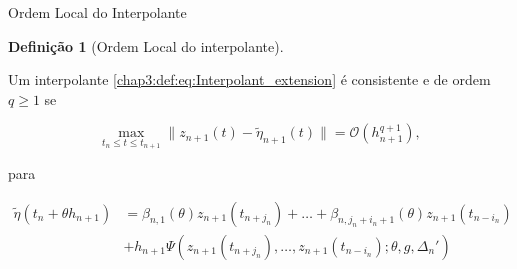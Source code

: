 \documentclass{beamer}
\theoremstyle{plain}
\theoremstyle{definition}
\newtheorem{defi}{Definição}
\begin{document}
\begin{frame}{Ordem Local do Interpolante}


    \small
    \begin{defi}[Ordem Local do interpolante]
        \label{chap3:def:interpolant_extension_order}

        Um interpolante \eqref{chap3:def:eq:Interpolant_extension} é consistente e de ordem $q \geq 1$ se


        \begin{equation}
            \max_{t_n \leq t \leq t_{n+1}}\| z_{n+1}(t) - \tilde{ \eta }_{n+1}(t) \| = \mathcal{O} (h_{n+1}^{q+1}), 
            \label{chap3:eq:Interpolant_extension_order}
        \end{equation}

        para 

        \begin{equation}
            \begin{split}
                \tilde{\eta}(t_{n} + \theta h_{n+1}) &= \beta_{n, 1}(\theta) z_{n+1}(t_{n+j_n}) + \dots + \beta_{n, j_n + i_n + 1}(\theta) z_{n+1}(t_{n-i_n}) \\
                                                     &+ h_{n+1} \Psi(z_{n+1}(t_{n+ j_n}), \dots, z_{n+1}(t_{n-i_n}); \theta,  g, \Delta_n ')
            \end{split}
            \label{chap3:def:interpolant_extension_order:eq:1}
        \end{equation}

    \end{defi}

\end{frame}



\end{document}

